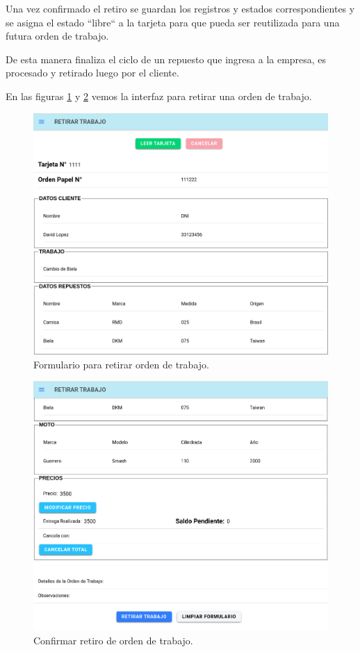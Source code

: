Una vez confirmado el retiro se guardan los registros y estados correspondientes y se asigna el estado ``libre`` a la tarjeta para que pueda ser reutilizada para una futura orden de trabajo.

De esta manera finaliza el ciclo de un repuesto que ingresa a la empresa, es procesado y retirado luego por el cliente.

En las figuras \ref{fig:retirar1} y \ref{fig:retirar2} vemos la interfaz para retirar una orden de trabajo.

\begin{figure}[H]
	\centering
	\includegraphics[scale=.35]{./Figures/retirar-1.png}
	\caption{Formulario para retirar orden de trabajo.}
	\label{fig:retirar1}
\end{figure}

\begin{figure}[H]
	\centering
	\includegraphics[scale=.35]{./Figures/retirar-2.png}
	\caption{Confirmar retiro de orden de trabajo.}
	\label{fig:retirar2}
\end{figure}

